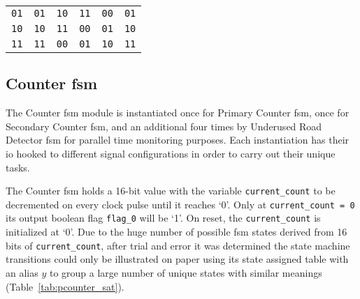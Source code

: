 \begin{table}[H]
\begin{NiceTabular}[t]{cccccc}
		\texttt{01}                                                    & \texttt{01}                                                  & \texttt{10}                                                  & \texttt{11}                                                  & \texttt{00}                                                  & \texttt{01}                                       \\
		\texttt{10}                                                    & \texttt{10}                                                  & \texttt{11}                                                  & \texttt{00}                                                  & \texttt{01}                                                  & \texttt{10}                                       \\
		\texttt{11}                                                    & \texttt{11}                                                  & \texttt{00}                                                  & \texttt{01}                                                  & \texttt{10}                                                  & \texttt{11}                                       \\
		\bottomrule
	\end{NiceTabular}
\end{table}
\subsection{Counter \acs{fsm}}
The Counter \ac{fsm} module is instantiated once for Primary Counter \ac{fsm}, once for Secondary Counter \ac{fsm}, and an additional four times by Underused Road Detector \ac{fsm} for parallel time monitoring purposes. Each instantiation has their \ac{io} hooked to different signal configurations in order to carry out their unique tasks.

The Counter \ac{fsm} holds a 16-bit value with the variable \texttt{current\_count} to be decremented on every clock pulse until it reaches `0'. Only at \texttt{current\_count = 0} its output boolean flag \texttt{flag\_0} will be `1'. On reset, the \texttt{current\_count} is initialized at `0'. Due to the huge number of possible \ac{fsm} states derived from 16 bits of \texttt{current\_count}, after trial and error it was determined the state machine transitions could only be illustrated on paper using its state assigned table with an alias $y$ to group a large number of unique states with similar meanings (Table~\ref{tab:pcounter_sat}).

